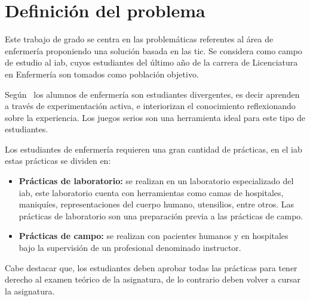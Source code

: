 \section{Definición del problema}

Este trabajo de grado se centra en las problemáticas referentes al área de
enfermería proponiendo una solución basada en las \gls{tic}. Se considera como
campo de estudio al \gls{iab}, cuyos estudiantes del último año de la carrera de
Licenciatura en Enfermería son tomados como población objetivo.


Según~\cite{humphreys2013developing} los alumnos de enfermería son estudiantes
divergentes, es decir aprenden a través de experimentación activa, e
interiorizan el conocimiento reflexionando sobre la experiencia. Los juegos
serios son una herramienta ideal para este tipo de
estudiantes\cite{humphreys2013developing}. 

Los estudiantes de enfermería requieren una gran cantidad de prácticas, en el
\Gls{iab} estas prácticas se dividen en:
\begin{itemize}
\item \textbf{Prácticas de laboratorio:} se realizan en un laboratorio
    especializado del \Gls{iab}, este laboratorio cuenta con herramientas como
    camas de hospitales, maniquíes, representaciones del cuerpo humano,
    utensilios, entre otros. Las prácticas de laboratorio son una
    preparación previa a las prácticas de campo.
\item \textbf{Prácticas de campo:} se realizan con pacientes humanos y en
    hospitales bajo la supervisión de un profesional denominado instructor. 
\end{itemize}

Cabe destacar que, los estudiantes deben aprobar todas las prácticas para tener 
derecho al examen teórico de la asignatura, de lo contrario deben volver a cursar la 
asignatura.

